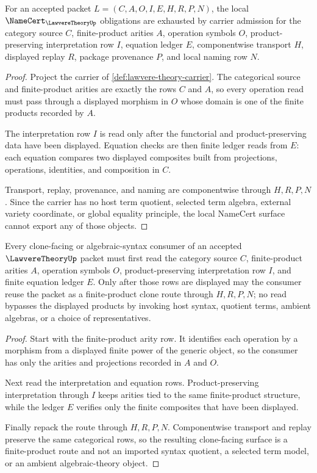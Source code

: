 \begin{theorem}
\label{thm:lawvere-theory-namecert-obligations}
For an accepted packet $L=(C,A,O,I,E,H,R,P,N)$, the local $\NameCert_{\LawvereTheoryUp}$ obligations are exhausted by carrier admission for the category source $C$, finite-product arities $A$, operation symbols $O$, product-preserving interpretation row $I$, equation ledger $E$, componentwise transport $H$, displayed replay $R$, package provenance $P$, and local naming row $N$.
\end{theorem}
\begin{proof}
Project the carrier of \autoref{def:lawvere-theory-carrier}. The categorical source and finite-product arities are exactly the rows $C$ and $A$, so every operation read must pass through a displayed morphism in $O$ whose domain is one of the finite products recorded by $A$.

The interpretation row $I$ is read only after the functorial and product-preserving data have been displayed. Equation checks are then finite ledger reads from $E$: each equation compares two displayed composites built from projections, operations, identities, and composition in $C$.

Transport, replay, provenance, and naming are componentwise through $H,R,P,N$. Since the carrier has no host term quotient, selected term algebra, external variety coordinate, or global equality principle, the local NameCert surface cannot export any of those objects.
\end{proof}

\begin{theorem}
\label{thm:lawvere-theory-finite-product-clone-route}
Every clone-facing or algebraic-syntax consumer of an accepted $\LawvereTheoryUp$ packet must first read the category source $C$, finite-product arities $A$, operation symbols $O$, product-preserving interpretation row $I$, and finite equation ledger $E$. Only after those rows are displayed may the consumer reuse the packet as a finite-product clone route through $H,R,P,N$; no read bypasses the displayed products by invoking host syntax, quotient terms, ambient algebras, or a choice of representatives.
\end{theorem}
\begin{proof}
Start with the finite-product arity row. It identifies each operation by a morphism from a displayed finite power of the generic object, so the consumer has only the arities and projections recorded in $A$ and $O$.

Next read the interpretation and equation rows. Product-preserving interpretation through $I$ keeps arities tied to the same finite-product structure, while the ledger $E$ verifies only the finite composites that have been displayed.

Finally repack the route through $H,R,P,N$. Componentwise transport and replay preserve the same categorical rows, so the resulting clone-facing surface is a finite-product route and not an imported syntax quotient, a selected term model, or an ambient algebraic-theory object.
\end{proof}

